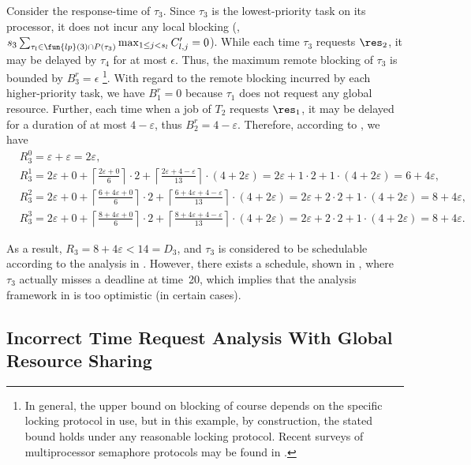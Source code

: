 Consider the response-time of $\tau_3$. Since $\tau_3$ is the lowest-priority task on its processor, it does not incur any local blocking (\ie,$s_3 \sum_{\tau_l \in \fun{lp}(3) \cap P(\tau_3)} \max_{1 \leq j < s_l} C_{l,j}^{\prime} = 0$). While each time $\tau_3$ requests $\res_2$, it may be delayed by $\tau_4$ for at most $\epsilon$. Thus, the maximum remote blocking of $\tau_3$ is bounded by $B_3^r = \epsilon$ \footnote{In general, the upper bound on blocking of course depends on the specific locking protocol in use, but in this example, by construction, the stated bound holds under any reasonable locking protocol. Recent surveys of multiprocessor semaphore protocols may be found in \cite{bbb-2013,yang-2015}.}. With regard to the remote blocking incurred by each higher-priority task, we have $B_1^r = 0$ because $\tau_1$ does not request any global resource. Further, each time when a job of $T_2$ requests $\res_1$, it may be delayed for a duration of at most $4-\varepsilon$, thus $B_2^r = 4-\varepsilon$. Therefore, according to , we have
\begin{align*}
& R_3^0 = \varepsilon + \varepsilon = 2\varepsilon, \\
& R_3^1 = 2\varepsilon + 0 + \left \lceil \frac{2\varepsilon + 0}{6} \right \rceil \cdot 2 + \left \lceil \frac{2\varepsilon + 4 - \varepsilon}{13} \right \rceil \cdot (4+2\varepsilon) = 2\varepsilon + 1 \cdot 2 + 1 \cdot (4+2\varepsilon) = 6+4\varepsilon, \\
& R_3^2 = 2\varepsilon + 0 + \left \lceil \frac{6+4\varepsilon + 0}{6} \right \rceil \cdot 2 + \left \lceil \frac{6+4\varepsilon + 4-\varepsilon}{13} \right \rceil \cdot (4+2\varepsilon) = 2\varepsilon + 2 \cdot 2 + 1 \cdot (4+2\varepsilon) = 8+4\varepsilon, \\
& R_3^3 = 2\varepsilon + 0 + \left \lceil \frac{8+4\varepsilon + 0}{6} \right \rceil \cdot 2 + \left \lceil \frac{8+4\varepsilon + 4-\varepsilon}{13} \right \rceil \cdot (4+2\varepsilon) = 2\varepsilon + 2 \cdot 2 + 1 \cdot (4+2\varepsilon) = 8+4\varepsilon.
\end{align*}
 
As a result, $R_3 = 8+4\varepsilon < 14 = D_3$, and $\tau_3$ is considered to be schedulable according to the analysis in \cite{lakshmanan-2009}. However, there exists a schedule, shown in , where $\tau_3$  actually misses a deadline at time~20, which implies that the analysis framework in \cite{lakshmanan-2009} is too optimistic (in certain cases). 

\subsection{Incorrect Time Request Analysis With Global Resource Sharing}

